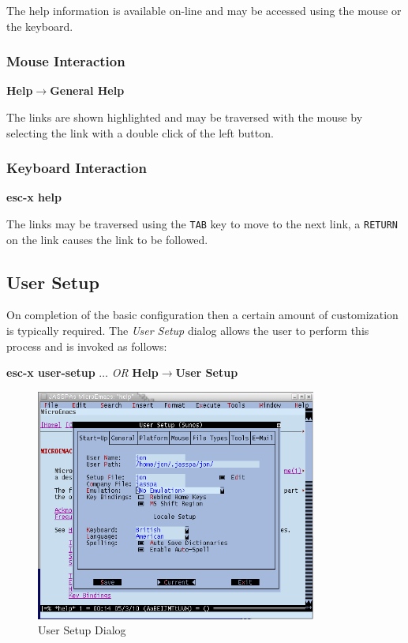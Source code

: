 \documentclass[11pt,a4paper,pdftex]{article}
\begin{document}
  The help information is available on-line and may be accessed using the
  mouse or the keyboard.

\subsubsection{Mouse Interaction}

  \textbf{Help$\rightarrow$General Help}

  The links are shown highlighted and may be traversed with the mouse by
  selecting the link with a double click of the left button.

\subsubsection{Keyboard Interaction}

  \textbf{esc-x help}

  The links may be traversed using the \texttt{TAB} key to move to the next
  link, a \texttt{RETURN} on the link causes the link to be followed.

\subsection{User Setup}

  On completion of the basic configuration then a certain amount of
  customization is typically required. The \textit{User Setup} dialog allows
  the user to perform this process and is invoked as follows:

  \textbf{esc-x user-setup} $\dots$ \textit{OR}\newline
  \textbf{Help$\rightarrow$User Setup}

\begin{figure}[!hbt]
  \begin{center}
    \includegraphics[keepaspectratio,height=3in]{usersetup}
    \caption{User Setup Dialog}
    \label{fig:usersetup}
  \end{center}
\end{figure}
\end{document}
